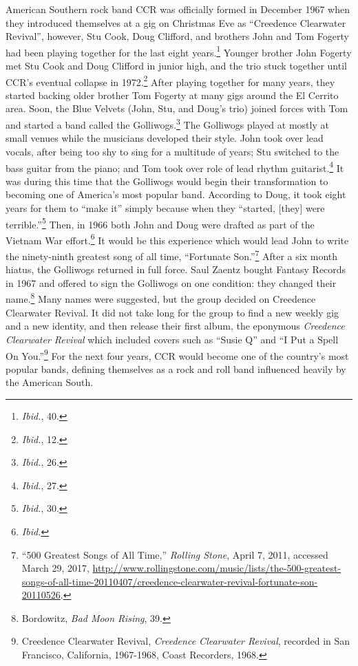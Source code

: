 \documentclass[10pt]{article}
\begin{document}
American Southern rock band CCR was officially formed in December 1967 when they introduced themselves at a gig on Christmas Eve as ``Creedence Clearwater Revival'', however, Stu Cook, Doug Clifford, and brothers John and Tom Fogerty had been playing together for the last eight years.\footnote{\textit{Ibid.}, 40.} Younger brother John Fogerty met Stu Cook and Doug Clifford in junior high, and the trio stuck together until CCR's eventual collapse in 1972.\footnote{\textit{Ibid.}, 12.} After playing together for many years, they started backing older brother Tom Fogerty at many gigs around the El Cerrito area. Soon, the Blue Velvets (John, Stu, and Doug's trio) joined forces with Tom and started a band called the Golliwogs.\footnote{\textit{Ibid.}, 26.} The Golliwogs played at mostly at small venues while the musicians developed their style. John took over lead vocals, after being too shy to sing for a multitude of years; Stu switched to the bass guitar from the piano; and Tom took over role of lead rhythm guitarist.\footnote{\textit{Ibid.}, 27.} It was during this time that the Golliwogs would begin their transformation to becoming one of America's most popular band. According to Doug, it took eight years for them to ``make it'' simply because when they ``started, [they] were terrible.''\footnote{\textit{Ibid.}, 30.} Then, in 1966 both John and Doug were drafted as part of the Vietnam War effort.\footnote{\textit{Ibid.}} It would be this experience which would lead John to write the ninety-ninth greatest song of all time, ``Fortunate Son.''\footnote{``500 Greatest Songs of All Time,'' \textit{Rolling Stone}, April 7, 2011, accessed March 29, 2017, \url{http://www.rollingstone.com/music/lists/the-500-greatest-songs-of-all-time-20110407/creedence-clearwater-revival-fortunate-son-20110526}.} After a six month hiatus, the Golliwogs returned in full force. Saul Zaentz bought Fantasy Records in 1967 and offered to sign the Golliwogs on one condition: they changed their name.\footnote{Bordowitz, \textit{Bad Moon Rising}, 39.} Many names were suggested, but the group decided on Creedence Clearwater Revival. It did not take long for the group to find a new weekly gig and a new identity, and then release their first album, the eponymous \textit{Creedence Clearwater Revival} which included covers such as ``Susie Q'' and ``I Put a Spell On You.''\footnote{Creedence Clearwater Revival, \textit{Creedence Clearwater Revival}, recorded in San Francisco, California, 1967-1968, Coast Recorders, 1968.} For the next four years, CCR would become one of the country's most popular bands, defining themselves as a rock and roll band influenced heavily by the American South.
\end{document}
